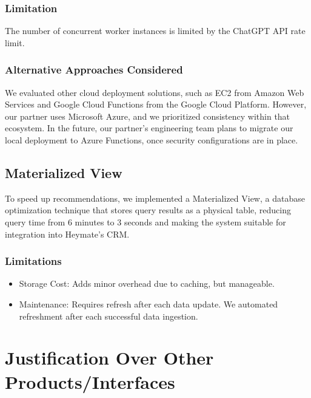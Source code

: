 \documentclass[
  11pt,
  a4paper,
  DIV=11,
  numbers=noendperiod]{scrartcl}
\providecommand{\tightlist}{%
  \setlength{\itemsep}{0pt}\setlength{\parskip}{0pt}}\usepackage{longtable,booktabs,array}
\begin{document}
\subsubsection{Limitation}\label{limitation-1}

The number of concurrent worker instances is limited by the ChatGPT API
rate limit.

\subsubsection{Alternative Approaches
Considered}\label{alternative-approaches-considered}

We evaluated other cloud deployment solutions, such as EC2 from Amazon
Web Services and Google Cloud Functions from the Google Cloud Platform.
However, our partner uses Microsoft Azure, and we prioritized
consistency within that ecosystem. In the future, our partner's
engineering team plans to migrate our local deployment to Azure
Functions, once security configurations are in place.

\subsection{Materialized View}\label{materialized-view}

To speed up recommendations, we implemented a Materialized View, a
database optimization technique that stores query results as a physical
table, reducing query time from 6 minutes to 3 seconds and making the
system suitable for integration into Heymate's CRM.

\subsubsection{Limitations}\label{limitations}

\begin{itemize}
\tightlist
\item
  Storage Cost: Adds minor overhead due to caching, but manageable.
\item
  Maintenance: Requires refresh after each data update. We automated
  refreshment after each successful data ingestion.
\end{itemize}

\section{Justification Over Other
Products/Interfaces}\label{justification-over-other-productsinterfaces}
\end{document}
